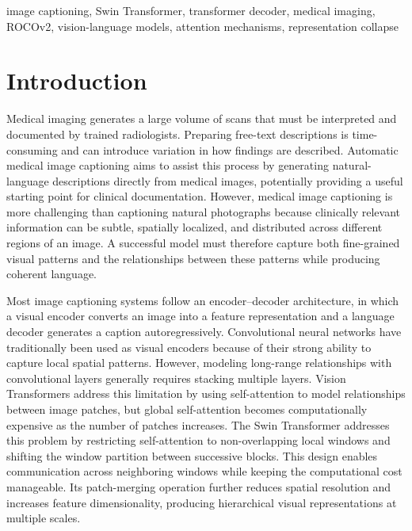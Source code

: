 \documentclass[conference]{IEEEtran}
\begin{document}
\begin{IEEEkeywords}
image captioning, Swin Transformer, transformer decoder, medical imaging, ROCOv2, vision-language models, attention mechanisms, representation collapse
\end{IEEEkeywords}



\section{Introduction}
\label{sec:intro}

Medical imaging generates a large volume of scans that must be interpreted and documented by trained radiologists. Preparing free-text descriptions is time-consuming and can introduce variation in how findings are described. Automatic medical image captioning aims to assist this process by generating natural-language descriptions directly from medical images, potentially providing a useful starting point for clinical documentation. However, medical image captioning is more challenging than captioning natural photographs because clinically relevant information can be subtle, spatially localized, and distributed across different regions of an image. A successful model must therefore capture both fine-grained visual patterns and the relationships between these patterns while producing coherent language.

Most image captioning systems follow an encoder--decoder architecture, in which a visual encoder converts an image into a feature representation and a language decoder generates a caption autoregressively. Convolutional neural networks have traditionally been used as visual encoders because of their strong ability to capture local spatial patterns. However, modeling long-range relationships with convolutional layers generally requires stacking multiple layers. Vision Transformers address this limitation by using self-attention to model relationships between image patches, but global self-attention becomes computationally expensive as the number of patches increases. The Swin Transformer addresses this problem by restricting self-attention to non-overlapping local windows and shifting the window partition between successive blocks. This design enables communication across neighboring windows while keeping the computational cost manageable. Its patch-merging operation further reduces spatial resolution and increases feature dimensionality, producing hierarchical visual representations at multiple scales.
\end{document}
